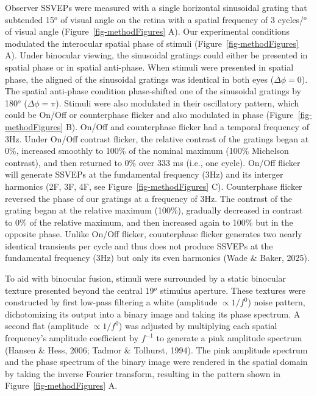 \documentclass[
  12pt,
]{article}
\begin{document}
Observer SSVEPs were measured with a single horizontal sinusoidal
grating that subtended 15\(^o\) of visual angle on the retina with a
spatial frequency of 3 cycles/\(^o\) of visual angle
(Figure~\ref{fig-methodFigures} A). Our experimental conditions
modulated the interocular spatial phase of stimuli
(Figure~\ref{fig-methodFigures} A). Under binocular viewing, the
sinusoidal gratings could either be presented in spatial phase or in
spatial anti-phase. When stimuli were presented in spatial phase, the
aligned of the sinusoidal gratings was identical in both eyes
(\(\Delta \phi = 0\)). The spatial anti-phase condition phase-shifted
one of the sinusoidal gratings by 180\(^o\) (\(\Delta \phi = \pi\)).
Stimuli were also modulated in their oscillatory pattern, which could be
On/Off or counterphase flicker and also modulated in phase
(Figure~\ref{fig-methodFigures} B). On/Off and counterphase flicker had
a temporal frequency of 3Hz. Under On/Off contrast flicker, the relative
contrast of the gratings began at 0\%, increased smoothly to 100\% of
the nominal maximum (100\% Michelson contrast), and then returned to 0\%
over 333 ms (i.e., one cycle). On/Off flicker will generate SSVEPs at
the fundamental frequency (3Hz) and its interger harmonics (2F, 3F, 4F,
see Figure~\ref{fig-methodFigures} C). Counterphase flicker reversed the
phase of our gratings at a frequency of 3Hz. The contrast of the grating
began at the relative maximum (100\%), gradually decreased in contrast
to 0\% of the relative maximum, and then increased again to 100\% but in
the opposite phase. Unlike On/Off flicker, counterphase flicker
generates two nearly identical transients per cycle and thus does not
produce SSVEPs at the fundamental frequency (3Hz) but only its even
harmonics (Wade \& Baker, 2025).

To aid with binocular fusion, stimuli were surrounded by a static
binocular texture presented beyond the central 19\(^o\) stimulus
aperture. These textures were constructed by first low-pass filtering a
white (amplitude \(\propto 1/f^0\)) noise pattern, dichotomizing its
output into a binary image and taking its phase spectrum. A second flat
(amplitude \(\propto 1/f^0\)) was adjusted by multiplying each spatial
frequency's amplitude coefficient by \(f^{-1}\) to generate a pink
amplitude spectrum (Hansen \& Hess, 2006; Tadmor \& Tolhurst, 1994). The
pink amplitude spectrum and the phase spectrum of the binary image were
rendered in the spatial domain by taking the inverse Fourier transform,
resulting in the pattern shown in Figure~\ref{fig-methodFigures} A.
\end{document}

